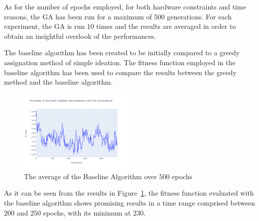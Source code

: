 As for the number of epochs employed, for both hardware constraints and time reasons, the GA has been run for a maximum of $500$ generations.
For each experiment, the GA is run $10$ times and the results are averaged in order to obtain an insightful overlook of the performances.

The baseline algorithm has been created to be initially compared to a greedy assignation method of simple ideation.
The fitness function employed in the baseline algorithm has been used to compare the results between the greedy method and the baseline algorithm.

\begin{figure}[h]
    \centering
    \includegraphics[width=0.5\textwidth]{../../../Code/Genetic/results/baseline/graphs/pop_size_200/500_epochs/average_fitness.png}
    \caption{The average of the Baseline Algorithm over $500$ epochs}
    \label{fig:average_baseline}
\end{figure}

As it can be seen from the results in Figure~\ref{fig:average_baseline}, the fitness function evaluated with the baseline algorithm shows promising results
in a time range comprised between $200$ and $250$ epochs, with its minimum at $230$.

